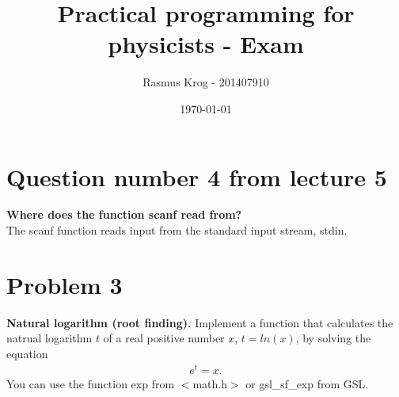\documentclass[a4paper,oneside,onecolumn,article,10pt]{memoir}
\title{Practical programming for physicists - Exam}
\author{Rasmus Krog - 201407910}
\date{\today}
\begin{document}
\maketitle
\thispagestyle{empty}

\noindent

\chapter*{Question number 4 from lecture 5}
\textbf{Where does the function scanf read from?} \\
The scanf function reads input from the standard input stream, stdin.

\chapter*{Problem 3}
\textbf{Natural logarithm (root finding).} Implement a function that calculates the natrual logarithm
$t$ of a real positive number $x$, $t=ln(x)$, by solving the equation 
\begin{align}\label{eq:log}
e^t = x.
\end{align}
You can use the function exp from $<$math.h$>$ or gsl\_sf\_exp from GSL. 
\end{document}
